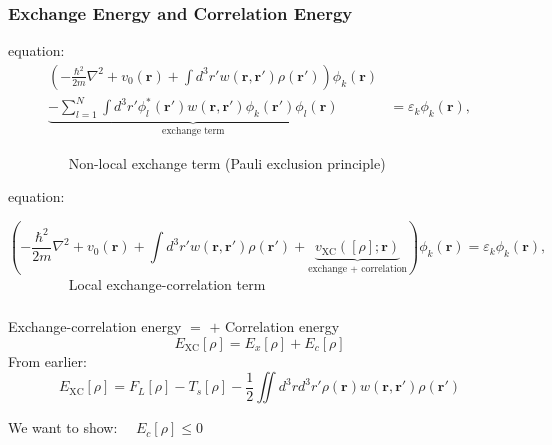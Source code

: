 \documentclass[compress]{beamer}
\begin{document}
\frame
{ 
  \frametitle{Exchange Energy and Correlation Energy}
  \begin{small}
    {\scriptsize

       equation:
      \begin{align}
        \left(-\frac{\hbar^{2}}{2m}\nabla^{2}+v_{0}(\mathbf{r})+\int d^{3}r'w(\mathbf{r},\mathbf{r}')\rho(\mathbf{r}')\right)\phi_{k}(\mathbf{r})& \nonumber \\
        \underbrace{-\sum_{l=1}^{N}\int d^{3}r'\phi_{l}^{*}(\mathbf{r}')w(\mathbf{r},\mathbf{r}')\phi_{k}(\mathbf{r}')\phi_{l}(\mathbf{r})}_{\text{exchange term}}
        &=\varepsilon_{k}\phi_{k}(\mathbf{r}), \nonumber
      \end{align}
      
      $\qquad \qquad $ \alert{Non-local} exchange term (Pauli exclusion principle)

      \vspace{5mm}     
       equation:

      \begin{equation}
         \left(-\frac{\hbar^{2}}{2m}\nabla^{2}+v_{0}(\mathbf{r})
           +\int d^{3}r'w(\mathbf{r},\mathbf{r}')\rho(\mathbf{r}')
           +\underbrace{v_{\mathrm{XC}}([\rho];\mathbf{r})}_{\text{exchange + correlation}}
         \right)\phi_{k}(\mathbf{r})=\varepsilon_{k}\phi_{k}(\mathbf{r}), \nonumber
       \end{equation}
       $\qquad \qquad $  \alert{Local} exchange-correlation term
      
    }
  \end{small}
}

\frame
{ 
  \frametitle{}
  \begin{small}
    {\scriptsize
      Exchange-correlation energy $=$  $+$ \alert{Correlation energy}
      \begin{equation}
        E_{\mathrm{XC}}[\rho]=E_{x}[\rho]+E_{c}[\rho] \nonumber
      \end{equation}
      From earlier: 
      \begin{equation}
        E_{\mathrm{XC}}[\rho]=F_{L}[\rho]-T_{s}[\rho]-\frac{1}{2}\iint d^{3}r d^{3}r' \rho(\mathbf{r})w(\mathbf{r},\mathbf{r}')\rho(\mathbf{r}') \nonumber
      \end{equation}
      \vspace{10mm}
      \begin{center}
        We want to show: $\quad $$E_{c}[\rho]\leq 0$
      \end{center}
    }
  \end{small}
}
\end{document}

